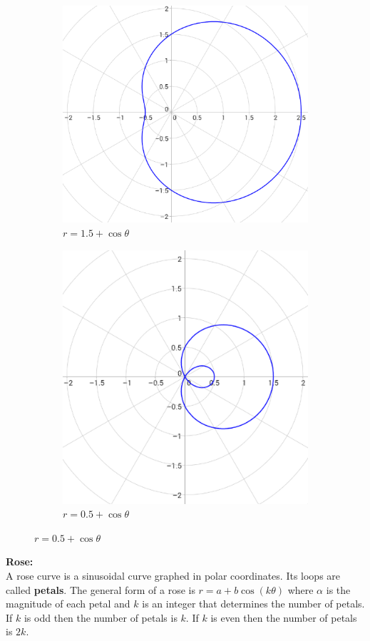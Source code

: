 \documentclass{article}
\begin{document}
            \begin{figure} [hbt!]
                \centering
                \begin{subfigure}{.5\textwidth}
                    \includegraphics[width=.4\linewidth]{Resources/Unit3Vectors/limacon1.PNG}
                    \caption*{$r=1.5+\cos\theta$}
                \end{subfigure}
                \begin{subfigure}{.5\textwidth}
                    \includegraphics[width=.4\linewidth]{Resources/Unit3Vectors/limacon2.PNG}
                    \caption*{$r=0.5+\cos\theta$}
                \end{subfigure}
            \end{figure}

            \noindent \textbf{Rose:} \\
            A rose curve is a sinusoidal curve graphed in polar coordinates. Its loops are called
            \textbf{petals}. The general form of a rose is $r=a+b\cos(k\theta)$ where $\alpha$ is
            the magnitude of each petal and $k$ is an integer that determines the number of petals.
            If $k$ is odd then the number of petals is $k$. If $k$ is even then the number of petals
            is $2k$. \\
\end{document}
